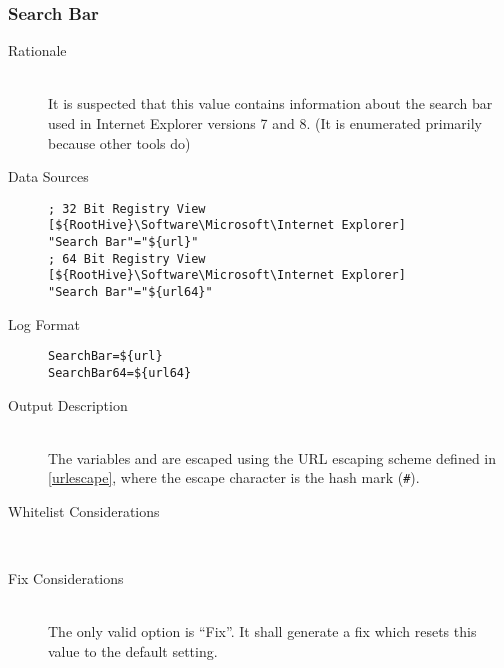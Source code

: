 \subsubsection{Search Bar}
\begin{description}
\item[Rationale]  \hfill \\ It is suspected that this value contains information
about the search bar used in Internet Explorer versions 7 and 8. (It is
enumerated primarily because other tools do)

\item[Data Sources] \hfill
\vspace{-\baselineskip}
\begin{verbatim}
; 32 Bit Registry View
[${RootHive}\Software\Microsoft\Internet Explorer]
"Search Bar"="${url}"
; 64 Bit Registry View
[${RootHive}\Software\Microsoft\Internet Explorer]
"Search Bar"="${url64}"
\end{verbatim}
\item[Log Format] \hfill
\vspace{-\baselineskip}
\begin{verbatim} 
SearchBar=${url}
SearchBar64=${url64}
\end{verbatim}
\item[Output Description] \hfill \\
The variables  and  are escaped using the URL escaping
scheme defined in \ref{urlescape}, where the escape character is the hash mark
(\verb|#|).
\item[Whitelist Considerations] \hfill \\

\item[Fix Considerations] \hfill \\
The only valid option is ``Fix''. It shall generate a fix which resets this
value to the default setting.
\end{description}

